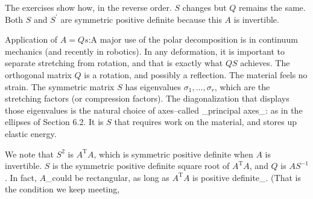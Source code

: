 The exercises show how, in the reverse order. \(S\) changes but \(Q\) remains the same. Both \(S\) and \(S^{\prime}\) are symmetric positive definite because this \(A\) is invertible.

Application of \(A=Qs\):A major use of the polar decomposition is in continuum mechanics (and recently in robotics). In any deformation, it is important to separate stretching from rotation, and that is exactly what \(QS\) achieves. The orthogonal matrix \(Q\) is a rotation, and possibly a reflection. The material feels no strain. The symmetric matrix \(S\) has eigenvalues \(\sigma_{1},\ldots,\sigma_{r}\), which are the stretching factors (or compression factors). The diagonalization that displays those eigenvalues is the natural choice of axes--called _principal axes_: as in the ellipses of Section 6.2. It is \(S\) that requires work on the material, and stores up elastic energy.

We note that \(S^{2}\) is \(A^{\mathrm{T}}A\), which is symmetric positive definite when \(A\) is invertible. \(S\) is the symmetric positive definite square root of \(A^{\mathrm{T}}A\), and \(Q\) is \(AS^{-1}\). In fact, \(A\)_could be rectangular, as long as \(A^{\mathrm{T}}A\) is positive definite_. (That is the condition we keep meeting, 